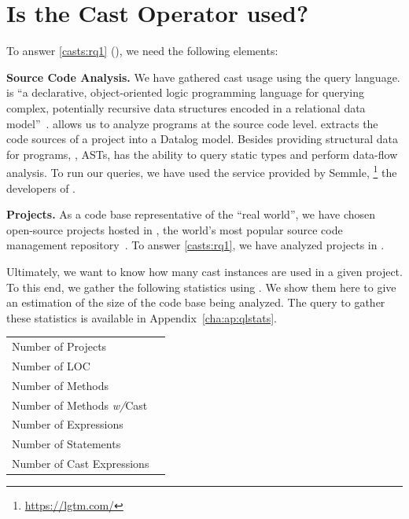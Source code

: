 \section{Is the Cast Operator used?}
\label{sec:casts:stats}



To answer \ref{casts:rq1} (\emph{\crqA}),
we need the following elements:

\textbf{Source Code Analysis.}
We have gathered cast usage using the \ql{} query language.
\ql{} is ``a declarative, object-oriented logic programming language for querying complex, potentially recursive data structures encoded in a relational data model''~\citep{avgustinovQLObjectorientedQueries2016}.
\ql{} allows us to analyze programs at the source code level.
\ql{} extracts the code sources of a project into a Datalog model.
Besides providing structural data for programs, \ie{}, ASTs,
\ql{} has the ability to query static types and perform data-flow analysis.
To run our \ql{} queries,
we have used the service provided by Semmle,%
\footnote{\url{https://lgtm.com/}} 
%
%
the developers of \ql{}.

\textbf{Projects.} 
As a code base representative of the ``real world'',
we have chosen open-source projects hosted in \github{},
the world's most popular source code
%
%
management repository~\citep{gousiosLeanGHTorrentGitHub2014}.
To answer \ref{casts:rq1}, we have analyzed \nproject{} \java{} projects in \lgtm{}.

Ultimately, we want to know how many cast instances are used in a given project.
To this end, we gather the following statistics using \ql{}.
We show them here to give an estimation of the size of the code base being analyzed.
The query to gather these statistics is available in Appendix~\ref{cha:ap:qlstats}.

\begin{center}
\begin{tabular}{lr}
	\hline
	Number of Projects 				& \nproject \\
	Number of LOC 					& \nloc{} \\
	Number of Methods 				& \nmethod \\
	Number of Methods \emph{w/}Cast	& \nmethodwithcast \\
    Number of Expressions			& \nexpr \\
    Number of Statements			& \nstmt \\
    Number of Cast Expressions		& \ncast \\
	\hline
\end{tabular}
\end{center}

